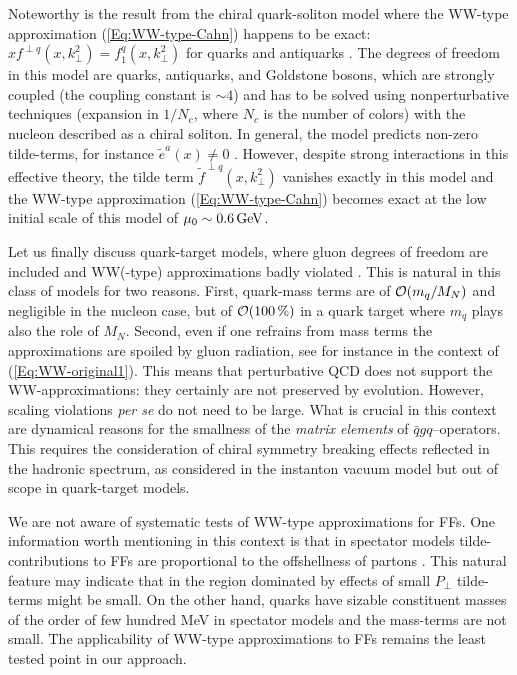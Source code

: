 \documentclass[a4paper,11pt]{article}
\def\kperp{k_\perp}
\begin{document}
Noteworthy is the result from the chiral quark-soliton
model where the WW-type approximation (\ref{Eq:WW-type-Cahn})
happens to be exact: $xf^{\perp q}(x,\kperp^2)=f_{1}^q(x,\kperp^2)$
for quarks and antiquarks \cite{Lorce:2014hxa}. The degrees of freedom
in this model are quarks, antiquarks, and Goldstone bosons, which are
strongly coupled (the coupling constant is $\sim 4$) and has to be
solved using nonperturbative techniques (expansion in $1/N_c$, where
$N_c$ is the number of colors) with the nucleon described as a
chiral soliton. In general, the model predicts non-zero tilde-terms, for
instance $\tilde{e}^a(x)\neq 0$
\cite{Schweitzer:2003uy,Ohnishi:2003mf,Cebulla:2007ej}.
However, despite strong interactions in this effective theory, the tilde
term $\tilde{f}^{\perp q}(x,\kperp^2)$ vanishes exactly in this model
\cite{Lorce:2014hxa} and the WW-type approximation (\ref{Eq:WW-type-Cahn})
becomes exact at the low initial scale of this model of
$\mu_0\sim 0.6\,{\rm GeV}$.

Let us finally discuss quark-target models,
where gluon degrees of freedom are included and WW(-type)
approximations badly violated
\cite{Kundu:2001pk,Schlegel:2004rg,Meissner:2007rx,Mukherjee:2009uy}.
This is natural in this class of models for two
reasons. First, quark-mass terms are of ${\cal O}(m_q/M_N)$
and negligible in the nucleon case, but of ${\cal O}(100\,\%)$
in a quark target where $m_q$ plays also the role of $M_N$.
Second, even if one refrains from mass terms the approximations are
spoiled by gluon radiation, see for instance \cite{Harindranath:1997qn}
in the context of (\ref{Eq:WW-original1}).
This means that perturbative QCD does not support the WW-approximations:
they certainly are not preserved by evolution. However, scaling violations
{\it per se} do not need to be large. What is crucial in this context are
dynamical reasons for the smallness of the {\sl matrix elements} of
$\bar{q}gq$--operators. This requires the consideration of chiral symmetry
breaking effects reflected in the hadronic spectrum, as considered in the
instanton vacuum model \cite{Balla:1997hf,Dressler:1999hc} but
out of scope in quark-target models.

We are not aware of systematic tests of WW-type approximations for FFs. One
information worth mentioning in this context is that in spectator models
\cite{Jakob:1997wg} tilde-contributions to FFs are proportional to the
offshellness of partons %
\cite{Lorce:2014hxa,Lorce:2016ugb}. This
natural feature may indicate that in the region dominated by effects of
small $P_\perp$ tilde-terms might be small. On the other hand, quarks have
sizable constituent masses of the order of few hundred MeV in spectator models
and the mass-terms are not small.
The applicability of WW-type approximations to FFs
remains the least tested point in our approach.
\end{document}
